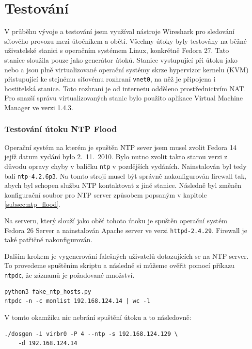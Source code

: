\chapter{Testování}
\label{chap:testovani}
V průběhu vývoje a testování jsem využíval nástroje Wireshark pro sledování síťového provozu mezi útočníkem a obětí. Všechny útoky byly testovány na běžné uživatelské stanici s operačním systémem Linux, konkrétně Fedora 27. Tato stanice sloužila pouze jako generátor útoků. Stanice vystupující při útoku jako  nebo  a  jsou plně virtualizované operační systémy skrze hypervizor kernelu (KVM) přistupující ke stejnému síťovému rozhraní \texttt{vnet0}, na něž je připojena i hostitelská stanice. Toto rozhraní je od internetu odděleno prostřednictvím NAT. Pro snazší správu virtualizovaných stanic bylo použito aplikace Virtual Machine Manager ve verzi 1.4.3.

\subsection{Testování útoku NTP Flood}
Operační systém na kterém je spuštěn NTP sever jsem musel zvolit Fedora 14 jejíž datum vydání bylo 2.\ 11.\ 2010. Bylo nutno zvolit takto starou verzi z důvodu opravy chyby v balíčku \texttt{ntp} v pozdějších vydáních. Nainstalován byl tedy balí \texttt{ntp-4.2.6p3}. Na tomto stroji musel být správně nakonfigurován firewall tak, abych byl schopen službu NTP kontaktovat z jiné stanice. Následně byl změněn konfigurační soubor pro NTP server způsobem popsaným v kapitole \ref{subsec:ntp_flood}.

Na serveru, který slouží jako oběť tohoto útoku je spuštěn operační systém Fedora 26 Server a nainstalován Apache server ve verzi \texttt{httpd-2.4.29}. Firewall je také patřičně nakonfigurován.

Dalším krokem je vygenerování falešných uživatelů dotazujících se na NTP server. To provedeme spuštěním skriptu a následně si můžeme ověřit pomocí příkazu \texttt{ntpdc}, že záznamů je požadované množství.
\begin{lstlisting}
python3 fake_ntp_hosts.py
ntpdc -n -c monlist 192.168.124.14 | wc -l
\end{lstlisting}

\noindent V tomto okamžiku nic nebrání spuštění útoku a to následovně:
\begin{lstlisting}
./dosgen -i virbr0 -P 4 --ntp -s 192.168.124.129 \
	-d 192.168.124.14
\end{lstlisting}

